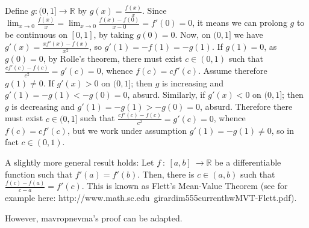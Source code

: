


\begin{solution}
	Define $ g : (0, 1] \to \mathbb{R}$ by $ g(x) = \frac {f(x)} {x}$. Since $ \lim_{x \to 0} \frac {f(x)} {x} = \lim_{x \to 0} \frac {f(x) - f(0)} {x - 0} = f'(0) = 0$, it means we can prolong $ g$ to be continuous on $ [0, 1]$, by taking $ g(0) = 0$. Now, on $ (0, 1]$ we have $ g'(x) = \frac {xf'(x) - f(x)} {x^2}$, so $ g'(1) = -f(1) = -g(1)$.
If $ g(1) = 0$, as $ g(0) = 0$, by Rolle's theorem, there must exist $ c \in (0, 1)$ such that $ \frac {cf'(c) - f(c)} {c^2} = g'(c) = 0$, whence $ f(c) = cf'(c)$.
Assume therefore $ g(1) \neq 0$. 
If $ g'(x) > 0$ on $ (0, 1]$; then $ g$ is increasing and $ g'(1) = -g(1) < -g(0) = 0$, absurd.
Similarly, if $ g'(x) < 0$ on $ (0, 1]$; then $ g$ is decreasing and $ g'(1) = -g(1) > -g(0) = 0$, absurd.
Therefore there must exist $ c \in (0, 1]$ such that $ \frac {cf'(c) - f(c)} {c^2} = g'(c) = 0$, whence $ f(c) = cf'(c)$, but we work under assumption  $ g'(1) = -g(1) \neq 0$, so in fact $ c \in (0, 1)$.
\end{solution}



\begin{solution}
	A slightly more general result holds: Let $ f\ : \ [a,b]\ \rightarrow \mathbb{R}$ be a differentiable function such that $ f'(a)=f'(b)$. Then, there is $ c \in (a,b)$ such that $ \frac{f(c)-f(a)}{c-a}=f'(c)$. This is known as Flett's Mean-Value Theorem (see for example here: http://www.math.sc.edu\/~girardi\/m555\/current\/hw\/MVT-Flett.pdf).

However, mavropnevma's proof can be adapted.
\end{solution}




